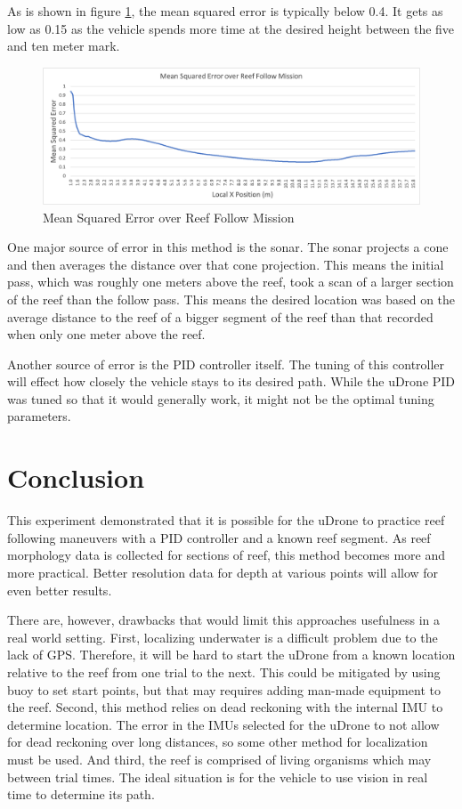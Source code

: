 As is shown in figure \ref{error}, the mean squared error is typically below 0.4. It gets as low as 0.15 as the vehicle spends more time at the desired height between the five and ten meter mark.  

\begin{figure}[h]
\includegraphics[width=\maxwidth{\textwidth}]{img/error.png}
\caption{Mean Squared Error over Reef Follow Mission}
\label{error}
\end{figure}
One major source of error in this method is the sonar. The sonar projects a cone and then averages the distance over that cone projection. This means the initial pass, which was roughly one meters above the reef, took a scan of a larger section of the reef than the follow pass. This means the desired location was based on the average distance to the reef of a bigger segment of the reef than that recorded when only one meter above the reef.

Another source of error is the PID controller itself. The tuning of this controller will effect how closely the vehicle stays to its desired path. While the uDrone PID was tuned so that it would generally work, it might not be the optimal tuning parameters.  

\section{Conclusion}

This experiment demonstrated that it is possible for the uDrone to practice reef following maneuvers with a PID controller and a known reef segment. As reef morphology data is collected for sections of reef, this method becomes more and more practical. Better resolution data for depth at various points will allow for even better results.

There are, however, drawbacks that would limit this approaches usefulness in a real world setting. First, localizing underwater is a difficult problem due to the lack of GPS. Therefore, it will be hard to start the uDrone from a known location relative to the reef from one trial to the next. This could be mitigated by using buoy to set start points, but that may requires adding man-made equipment to the reef. Second, this method relies on dead reckoning with the internal IMU to determine location. The error in the IMUs selected for the uDrone to not allow for dead reckoning over long distances, so some other method for localization must be used. And third, the reef is comprised of living organisms which may between trial times. The ideal situation is for the vehicle to use vision in real time to determine its path.